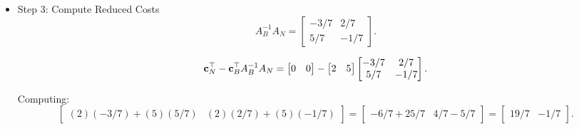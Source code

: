 \begin{solution}
\begin{itemize}
Thus, the system can be written as 
$$
\x_B = A_B^{-1} \b - A_B^{-1}A_N \x_N,
$$
that is
\begin{equation}
\begin{bmatrix} x_1 \\ x_2\end{bmatrix} = \begin{bmatrix} 6 \\ 5\end{bmatrix} - \begin{bmatrix}
    -3/7 & 2/7 \\
    5/7 & -1/7
\end{bmatrix} \begin{bmatrix} s_1 \\ s_2 \end{bmatrix},
\end{equation}
or equivalently
\begin{equation}
\begin{bmatrix} x_1 \\ x_2\end{bmatrix} = \begin{bmatrix} 6 \\ 5\end{bmatrix} - s_1 \begin{bmatrix}
    -3/7  \\
    5/7 
\end{bmatrix} - s_2 \begin{bmatrix}
     2/7 \\
    -1/7
\end{bmatrix} 
\end{equation}


\item {Step 3: Compute Reduced Costs}
\[
A_B^{-1} A_N =
\begin{bmatrix}
    -3/7 & 2/7 \\
    5/7 & -1/7
\end{bmatrix}.
\]

\[
\mathbf{c}_N^\top -\mathbf{c}_B^\top A_B^{-1} A_N =
\begin{bmatrix}
    0 & 0
\end{bmatrix}
-
\begin{bmatrix}
    2 & 5
\end{bmatrix}
\begin{bmatrix}
    -3/7 & 2/7 \\
    5/7 & -1/7
\end{bmatrix}.
\]

Computing:
\[
\begin{bmatrix}
    (2)(-3/7) + (5)(5/7) & (2)(2/7) + (5)(-1/7)
\end{bmatrix}
=
\begin{bmatrix}
    -6/7 + 25/7 & 4/7 - 5/7
\end{bmatrix}
=
\begin{bmatrix}
    19/7 & -1/7
\end{bmatrix}.
\]


\end{itemize}
\end{solution}
